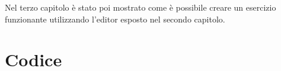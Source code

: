 \documentclass[a4paper,12pt]{report}
\begin{document}
Nel terzo capitolo \`{e} stato poi mostrato come \`{e} possibile creare un esercizio funzionante utilizzando l'editor esposto nel secondo capitolo.
\newpage
{}
\begin{thebibliography}{99}

\end{thebibliography}
\appendix
\linespread{1}
\chapter{Codice}

\def\baselinestretch{0.7}
\def\baselinestretch{1}
\end{document}
